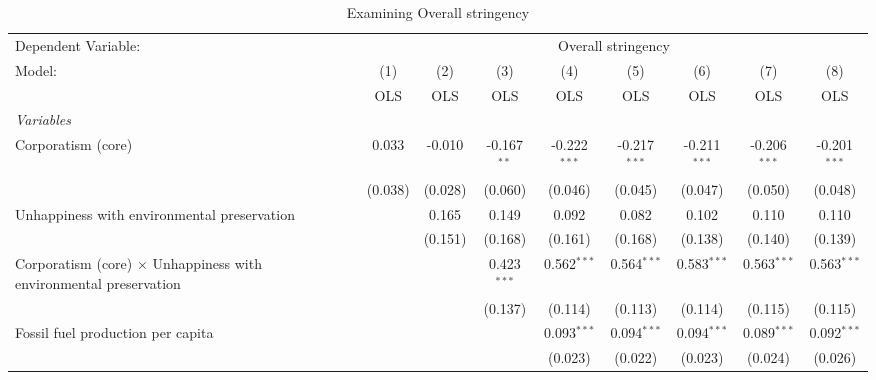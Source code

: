 
\begin{table}[htbp]
   \caption{Examining Overall stringency}
   \centering
   \begin{tabular}{lcccccccc}
      \toprule
      Dependent Variable: & \multicolumn{8}{c}{Overall stringency}\\
      Model:                                                                   & (1)     & (2)     & (3)           & (4)            & (5)            & (6)            & (7)            & (8)\\  
                                                                               &  OLS    & OLS     & OLS           & OLS            & OLS            & OLS            & OLS            & OLS\\  
      \midrule
      \emph{Variables}\\
      Corporatism (core)                                                       & 0.033   & -0.010  & -0.167$^{**}$ & -0.222$^{***}$ & -0.217$^{***}$ & -0.211$^{***}$ & -0.206$^{***}$ & -0.201$^{***}$\\   
                                                                               & (0.038) & (0.028) & (0.060)       & (0.046)        & (0.045)        & (0.047)        & (0.050)        & (0.048)\\   
      Unhappiness with environmental preservation                              &         & 0.165   & 0.149         & 0.092          & 0.082          & 0.102          & 0.110          & 0.110\\   
                                                                               &         & (0.151) & (0.168)       & (0.161)        & (0.168)        & (0.138)        & (0.140)        & (0.139)\\   
      Corporatism (core) $\times$ Unhappiness with environmental preservation  &         &         & 0.423$^{***}$ & 0.562$^{***}$  & 0.564$^{***}$  & 0.583$^{***}$  & 0.563$^{***}$  & 0.563$^{***}$\\   
                                                                               &         &         & (0.137)       & (0.114)        & (0.113)        & (0.114)        & (0.115)        & (0.115)\\   
      Fossil fuel production per capita                                        &         &         &               & 0.093$^{***}$  & 0.094$^{***}$  & 0.094$^{***}$  & 0.089$^{***}$  & 0.092$^{***}$\\   
                                                                               &         &         &               & (0.023)        & (0.022)        & (0.023)        & (0.024)        & (0.026)\\   

\end{tabular}
\end{table}
